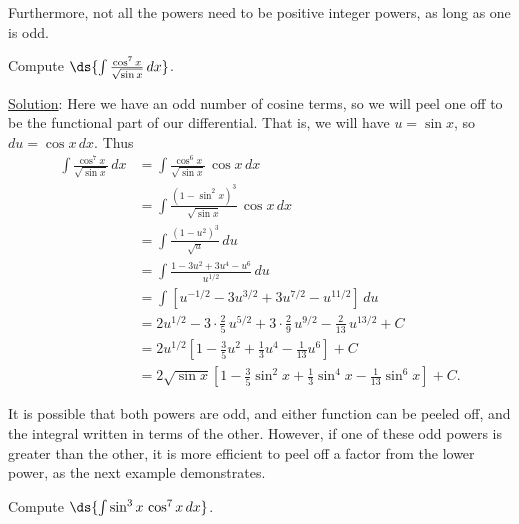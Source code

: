 Furthermore, not all the powers need to be positive integer powers,
as long as one is odd.

\bex Compute $\ds{\int\frac{\cos^7x}{\sqrt{\sin x}}\,dx}$.

\underline{Solution}:  Here we have an odd number of cosine terms,
so we will peel one off to be the functional part of our differential.
That is, we will have $u=\sin x$, so $du=\cos x\,dx$. Thus
\begin{align*}
\int\frac{\cos^7x}{\sqrt{\sin x}}\,dx
&=\int\frac{\cos^6x}{\sqrt{\sin x}}\,\cos x\,dx\\
&=\int\frac{\left(1-\sin^2x\right)^3}{\sqrt{\sin x}}\,\cos x\,dx\\
&=\int\frac{\left(1-u^2\right)^3}{\sqrt{u}}\,du\\
&=\int\frac{1-3u^2+3u^4-u^6}{u^{1/2}}\,du\\
&=\int\left[u^{-1/2}-3u^{3/2}+3u^{7/2}-u^{11/2}\right]\,du\\
&=2u^{1/2}-3\cdot\frac25\,u^{5/2}+3\cdot\frac29\,u^{9/2}-\frac2{13}\,u^{13/2}
          +C\\
&=2u^{1/2}\left[1-\frac35u^2+\frac13u^4-\frac1{13}u^6\right]+C\\
&=2\sqrt{\sin x}\left[1-\frac35\sin^2x+\frac13\sin^4x-\frac1{13}\sin^6x\right]
   +C.
\end{align*}
\eex

It is possible that both powers are odd, and either
function can be peeled off, and the integral written in terms of the
other.  However, if one of these odd powers is greater than the other,
it is more efficient to peel off a factor from the lower power, as the
next example demonstrates.

\bex Compute $\ds{\int\sin^3x\,\cos^7x\,dx}$.

